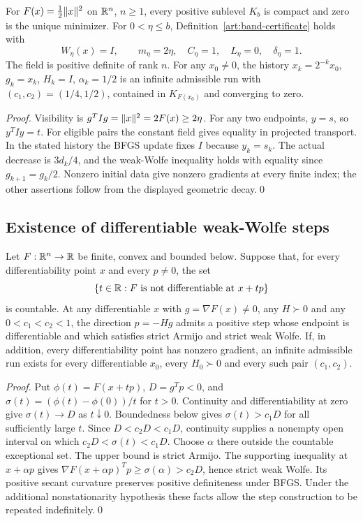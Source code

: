 \begin{proposition}\label{art:examples-full-rank}
For $F(x)=\tfrac12\lVert x\rVert^2$ on $\mathbb R^n$, $n\ge1$, every positive sublevel
$K_b$ is compact and zero is the unique minimizer. For $0<\eta\le b$,
Definition~\ref{art:band-certificate} holds with
\[
 W_\eta(x)=I,\qquad m_\eta=2\eta,\quad C_\eta=1,
 \quad L_\eta=0,\quad\delta_\eta=1.
\]
The field is positive definite of rank $n$. For any $x_0\ne0$, the history
$x_k=2^{-k}x_0$, $g_k=x_k$, $H_k=I$, $\alpha_k=1/2$ is an infinite
admissible run with $(c_1,c_2)=(1/4,1/2)$, contained in $K_{F(x_0)}$ and
converging to zero.
\end{proposition}
\begin{proof}
Visibility is $g^TIg=\lVert x\rVert^2=2F(x)\ge2\eta$. For any two endpoints,
$y=s$, so $y^TIy=t$. For eligible pairs the constant field gives equality in projected transport.
In the stated history the BFGS update fixes $I$ because $y_k=s_k$.
The actual decrease is $3d_k/4$, and the weak-Wolfe inequality holds with
equality since $g_{k+1}=g_k/2$. Nonzero initial data give nonzero gradients
at every finite index; the other assertions follow from the displayed
geometric decay.\qed
\end{proof}

\subsection{Existence of differentiable weak-Wolfe steps}

\begin{lemma}\label{art:examples-run-existence}
Let $F:\mathbb R^n\to\mathbb R$ be finite, convex and bounded below. Suppose that, for
every differentiability point $x$ and every $p\ne0$, the set
\[
 \{t\in\mathbb R:F\text{ is not differentiable at }x+tp\}
\]
is countable. At any differentiable $x$ with $g=\nabla F(x)\ne0$, any
$H\succ0$ and any $0<c_1<c_2<1$, the direction $p=-Hg$ admits a positive
step whose endpoint is differentiable and which satisfies strict Armijo
and strict weak Wolfe. If, in addition, every differentiability point has
nonzero gradient, an infinite admissible run exists for every differentiable
$x_0$, every $H_0\succ0$ and every such pair $(c_1,c_2)$.
\end{lemma}
\begin{proof}
Put $\phi(t)=F(x+tp)$, $D=g^Tp<0$, and
$\sigma(t)=(\phi(t)-\phi(0))/t$ for $t>0$.
Continuity and differentiability at zero give $\sigma(t)\to D$ as
$t\downarrow0$. Boundedness below gives $\sigma(t)>c_1D$ for all
sufficiently large $t$. Since $D<c_2D<c_1D$, continuity supplies a
nonempty open interval on which $c_2D<\sigma(t)<c_1D$.
Choose $\alpha$ there outside the countable exceptional set. The upper
bound is strict Armijo. The supporting inequality at $x+\alpha p$ gives
$\nabla F(x+\alpha p)^Tp\ge\sigma(\alpha)>c_2D$, hence strict weak Wolfe.
Its positive secant curvature preserves positive definiteness under BFGS.
Under the additional nonstationarity hypothesis these facts allow the step
construction to be repeated indefinitely.\qed
\end{proof}

